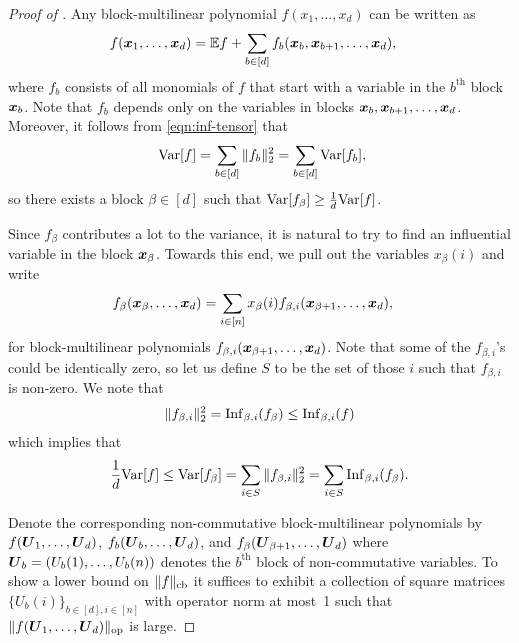 \begin{proof}[Proof of ]
Any block-multilinear polynomial $f(x_1, \ldots, x_d)$ can be written as 
\begin{align*}
    f(\boldsymbol{x}_1,\ldots, \boldsymbol{x}_d) &= \mathbb{E} f + \sum_{b\in [d]} f_b(\boldsymbol{x}_b, \boldsymbol{x}_{b+1}, \ldots, \boldsymbol{x}_d),
\end{align*}
where $f_b$ consists of all monomials of $f$ that start with a variable in the $b^\text{th}$ block $\boldsymbol{x}_b$. Note that $f_b$ depends only on the variables in blocks $\boldsymbol{x}_b, \boldsymbol{x}_{b+1},\ldots, \boldsymbol{x}_d$. Moreover, it follows from \eqref{eqn:inf-tensor} that 
 \begin{equation}\label{eqn:var-general}
     \ \mathrm{Var}[f] = \sum_{b \in [d]} \|f_b\|_2^2 = \sum_{b \in [d]} \mathrm{Var}[f_b],
 \end{equation}
so there exists a block $\beta \in [d]$ such that $\mathrm{Var}[f_{\beta}] \ge \frac{1}{d}\mathrm{Var}[f]$. 

Since $f_{\beta}$ contributes a lot to the variance, it is natural to try to find an influential variable in the block $\boldsymbol{x}_{\beta}$. Towards this end,  we pull out the variables $x_{\beta}(i)$ and write
\begin{align*}
    f_{\beta}(\boldsymbol{x}_{\beta},\ldots, \boldsymbol{x}_d) &= \sum_{i\in [n]} x_{\beta}(i) f_{\beta,i}(\boldsymbol{x}_{\beta+1}, \ldots, \boldsymbol{x}_d),
\end{align*}
for block-multilinear polynomials $f_{\beta,i}(\boldsymbol{x}_{\beta+1}, \ldots, \boldsymbol{x}_d)$. Note that some of the $f_{\beta,i}$'s could be identically zero, so let us define $S$ to be the set of those $i$ such that $f_{\beta,i}$ is non-zero. We note that
\begin{align} \label{eqn:part-inf}
  \|f_{\beta,i}\|_2^2  =  \mathrm{Inf}_{\beta,i}(f_{\beta}) \le \mathrm{Inf}_{\beta,i}(f)  
\end{align}
which implies that
\begin{align}\label{eqn:var-main}
    \frac{1}{d} \mathrm{Var}[f] \le \mathrm{Var}[f_{\beta}] = \sum_{i \in S}\|f_{\beta,i}\|_2^2 = \sum_{i \in S} \mathrm{Inf}_{\beta,i}(f_{\beta}).
\end{align}
\begin{sloppypar}
Denote the corresponding non-commutative block-multilinear polynomials by $f(\boldsymbol{U}_1, \ldots, \boldsymbol{U}_d)$,  $f_b(\boldsymbol{U}_{b}, \ldots,\boldsymbol{U}_d)$, and $f_{\beta}(\boldsymbol{U}_{\beta+1}, \ldots,\boldsymbol{U}_d)$ where $\boldsymbol{U}_b = (U_b(1), \ldots, U_b(n))$ denotes the $b^\text{th}$ block of non-commutative variables. To show a lower bound on $\|f\|_{\mathrm{cb}}$ it suffices to exhibit a collection of square matrices $\{U_b(i)\}_{b\in [d], i \in [n]}$ with operator norm at most~1 such that $\|f(\boldsymbol{U}_1, \ldots, \boldsymbol{U}_d)\|_{\mathrm{op}}$ is large.
\end{sloppypar}
  

\end{proof}
